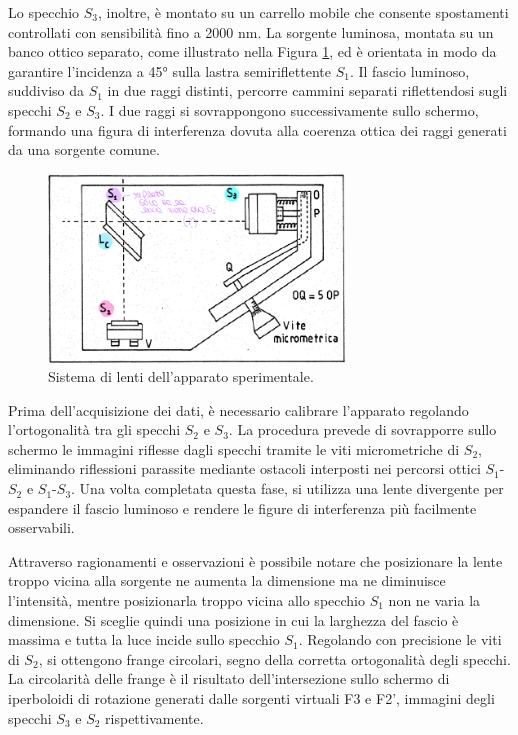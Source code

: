 \documentclass[a4paper,12pt]{article}
\begin{document}
Lo specchio \(S_3\), inoltre, è montato su un carrello mobile che consente spostamenti controllati con sensibilità fino a 2000 nm. La sorgente luminosa, montata su un banco ottico separato, come illustrato nella Figura \ref{fig:Sistema_lenti}, ed è orientata in modo da garantire l’incidenza a 45° sulla lastra semiriflettente \(S_1\). Il fascio luminoso, suddiviso da \(S_1\) in due raggi distinti, percorre cammini separati riflettendosi sugli specchi \(S_2\) e \(S_3\). I due raggi si sovrappongono successivamente sullo schermo, formando una figura di interferenza dovuta alla coerenza ottica dei raggi generati da una sorgente comune.

\begin{figure}[H]
    \centering
    \includegraphics[width=0.7\textwidth]{apparato1.png}
    \caption{Sistema di lenti dell'apparato sperimentale.}
    \label{fig:Sistema_lenti}
\end{figure}

Prima dell’acquisizione dei dati, è necessario calibrare l’apparato regolando l’ortogonalità tra gli specchi \(S_2\) e \(S_3\). La procedura prevede di sovrapporre sullo schermo le immagini riflesse dagli specchi tramite le viti micrometriche di \(S_2\), eliminando riflessioni parassite mediante ostacoli interposti nei percorsi ottici \(S_1\)-\(S_2\) e \(S_1\)-\(S_3\). Una volta completata questa fase, si utilizza una lente divergente per espandere il fascio luminoso e rendere le figure di interferenza più facilmente osservabili. 

Attraverso ragionamenti e osservazioni è possibile notare che posizionare la lente troppo vicina alla sorgente ne aumenta la dimensione ma ne diminuisce l’intensità, mentre posizionarla troppo vicina allo specchio \(S_1\) non ne varia la dimensione. Si sceglie quindi una posizione in cui la larghezza del fascio è massima e tutta la luce incide sullo specchio \(S_1\). Regolando con precisione le viti di \(S_2\), si ottengono frange circolari, segno della corretta ortogonalità degli specchi. La circolarità delle frange è il risultato dell’intersezione sullo schermo di iperboloidi di rotazione generati dalle sorgenti virtuali F3 e F2', immagini degli specchi \(S_3\) e \(S_2\) rispettivamente. 
\end{document}
